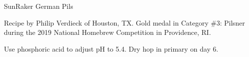\begin{recipe}{SunRaker German Pils}

\begin{aboutblock}
Recipe by Philip Verdieck of Houston, TX. Gold medal in Category \#3: Pilsner
during the 2019 National Homebrew Competition in Providence, RI. \sourceaha
\end{aboutblock}


\begin{methodandtiming}
 
\begin{mashsteps}
\end{mashsteps}

\begin{fermentationsteps}
\end{fermentationsteps}

\begin{directions}
Use phosphoric acid to adjust pH to 5.4. Dry hop in primary on day 6. 
\end{directions}

\end{methodandtiming}

\recipebreak

\begin{ingredientsblock}

\begin{malts}
\end{malts}

\begin{hops}
\end{hops}


\end{ingredientsblock}

\end{recipe}
